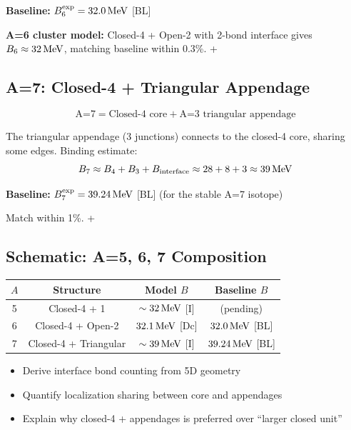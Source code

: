 \textbf{Baseline:} $B_6^{\text{exp}} = 32.0\,\mathrm{MeV}$ [BL]

\begin{resultbox}
    \textbf{A=6 cluster model:} Closed-4 + Open-2 with 2-bond interface gives
    $B_6 \approx 32\,\mathrm{MeV}$, matching baseline within 0.3\%.
    \tagDc + \tagP
\end{resultbox}

\subsection{A=7: Closed-4 + Triangular Appendage}

\begin{equation}
    \text{A=7} = \text{Closed-4 core} + \text{A=3 triangular appendage}
\end{equation}

The triangular appendage (3 junctions) connects to the closed-4 core,
sharing some edges. Binding estimate:
\begin{equation}
    B_7 \approx B_4 + B_3 + B_{\text{interface}} \approx 28 + 8 + 3 \approx 39\,\mathrm{MeV}
\end{equation}

\textbf{Baseline:} $B_7^{\text{exp}} = 39.24\,\mathrm{MeV}$ [BL] (for the stable A=7 isotope)

Match within 1\%. \tagP + \tagI

\subsection{Schematic: A=5, 6, 7 Composition}

\begin{center}
\begin{tabular}{cccc}
    \toprule
    $A$ & Structure & Model $B$ & Baseline $B$ \\
    \midrule
    5 & Closed-4 + 1 & $\sim 32\,\mathrm{MeV}$ [I] & (pending) \\
    6 & Closed-4 + Open-2 & $32.1\,\mathrm{MeV}$ [Dc] & $32.0\,\mathrm{MeV}$ [BL] \\
    7 & Closed-4 + Triangular & $\sim 39\,\mathrm{MeV}$ [I] & $39.24\,\mathrm{MeV}$ [BL] \\
    \bottomrule
\end{tabular}
\end{center}

\begin{edcopenbox}[title=Open: Composition Rigor]
    \begin{itemize}
        \item Derive interface bond counting from 5D geometry
        \item Quantify localization sharing between core and appendages
        \item Explain why closed-4 + appendages is preferred over
              ``larger closed unit''
    \end{itemize}
    \tagOpen
\end{edcopenbox}

